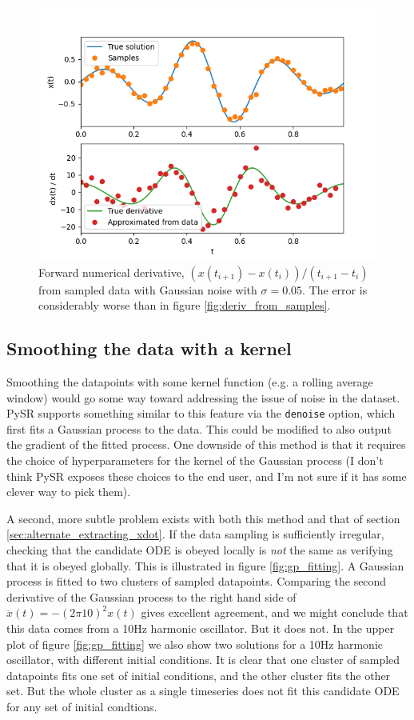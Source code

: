 \documentclass{article}
\begin{document}
\begin{figure}
\includegraphics{images/alternative_methods/deriv_from_noisy_samples.png}
\centering
\caption{Forward numerical derivative, $\left(x(t_{i+1}) - x(t_i)\right)/\left(t_{i+1} - t_i\right)$ from sampled data with Gaussian noise with $\sigma = 0.05$. The error is considerably worse than in figure \ref{fig:deriv_from_samples}.}
\label{fig:deriv_from_noisy_samples}
\end{figure}

\subsection{Smoothing the data with a kernel}

Smoothing the datapoints with some kernel function (e.g. a rolling average window) would go some way toward addressing the issue of noise in the dataset.
PySR supports something similar to this feature via the \texttt{denoise} option, which first fits a Gaussian process to the data.
This could be modified to also output the gradient of the fitted process.
One downside of this method is that it requires the choice of hyperparameters for the kernel of the Gaussian process (I don't think PySR exposes these choices to the end user, and I'm not sure if it has some clever way to pick them).

A second, more subtle problem exists with both this method and that of section \ref{sec:alternate_extracting_xdot}. If the data sampling is sufficiently irregular, checking that the candidate ODE is obeyed locally is \emph{not} the same as verifying that it is obeyed globally.
This is illustrated in figure \ref{fig:gp_fitting}.
A Gaussian process is fitted to two clusters of sampled datapoints.
Comparing the second derivative of the Gaussian process to the right hand side of $\ddot{x}(t) = -(2\pi10)^2 x(t)$ gives excellent agreement, and we might conclude that this data comes from a 10Hz harmonic oscillator.
But it does not.
In the upper plot of figure \ref{fig:gp_fitting} we also show two solutions for a 10Hz harmonic oscillator, with different initial conditions.
It is clear that one cluster of sampled datapoints fits one set of initial conditions, and the other cluster fits the other set.
But the whole cluster as a single timeseries does not fit this candidate ODE for any set of initial condtions.
\end{document}
